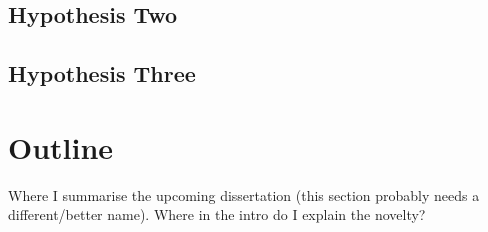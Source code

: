 \subsection{Hypothesis Two}

\subsection{Hypothesis Three}

\section{Outline}
Where I summarise the upcoming dissertation (this section probably needs a different/better name).  Where in the intro do I explain the novelty?